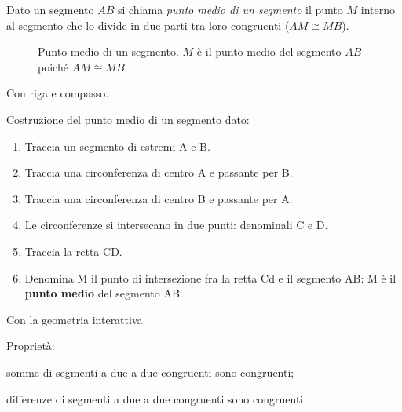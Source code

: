 \begin{definizione}
Dato un segmento $AB$ si chiama \emph{punto medio di un segmento} il 
punto $M$ interno al segmento che lo divide in due parti tra loro 
congruenti ($AM\cong MB$).
\end{definizione}

\begin{inaccessibleblock}
 \begin{figure}[htb]
\centering
\caption{Punto medio di un segmento. $M$ è il punto medio del 
segmento $AB$ poiché $AM\cong MB$}
\end{figure}
\end{inaccessibleblock}

Con riga e compasso.

\begin{procedura}\label{proc:fonda_puntomedio}
  Costruzione del punto medio di un segmento dato:
  \begin{enumerate} [nosep]
    \item 
    Traccia un segmento di estremi A e B.  
    \item 
    Traccia una circonferenza di centro A e passante per B. 
    \item 
    Traccia una circonferenza di centro B e passante per A.  
    \item 
    Le circonferenze si intersecano in due punti: denominali C e D. 
    \item 
    Traccia la retta CD.
    \item 
    Denomina M il punto di intersezione fra la retta Cd e il segmento AB: M è 
il \textbf{punto medio} del segmento AB.
    \end{enumerate}
\end{procedura}

Con la geometria interattiva.



Proprietà:
\begin{itemize*}
\item somme di segmenti a due a due congruenti sono congruenti; 
\item differenze di segmenti a due a due congruenti sono congruenti.
\end{itemize*}

